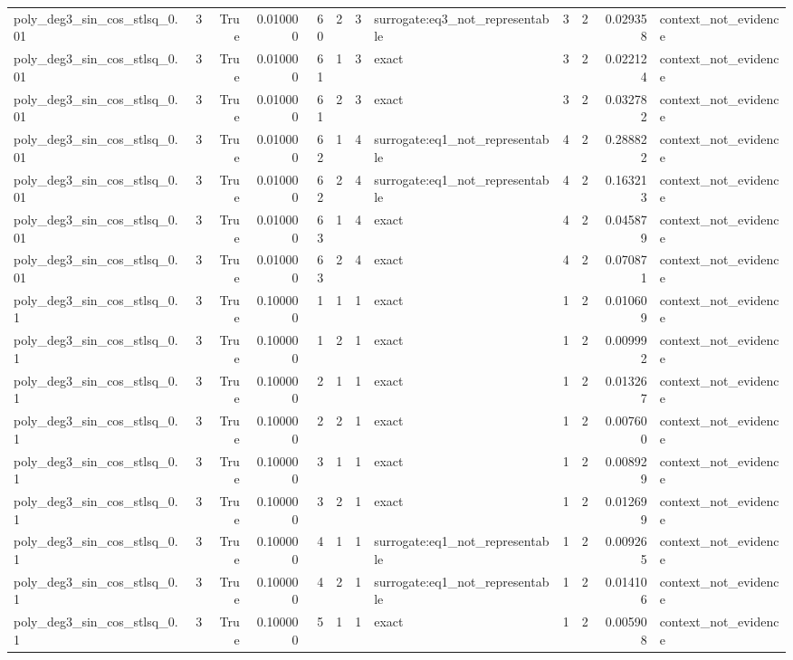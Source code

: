 \begin{tabular}{lrrrrrrlrrrl}
poly\_deg3\_sin\_cos\_stlsq\_0.01 & 3 & True & 0.010000 & 60 & 2 & 3 & surrogate:eq3\_not\_representable & 3 & 2 & 0.029358 & context\_not\_evidence \\
poly\_deg3\_sin\_cos\_stlsq\_0.01 & 3 & True & 0.010000 & 61 & 1 & 3 & exact & 3 & 2 & 0.022124 & context\_not\_evidence \\
poly\_deg3\_sin\_cos\_stlsq\_0.01 & 3 & True & 0.010000 & 61 & 2 & 3 & exact & 3 & 2 & 0.032782 & context\_not\_evidence \\
poly\_deg3\_sin\_cos\_stlsq\_0.01 & 3 & True & 0.010000 & 62 & 1 & 4 & surrogate:eq1\_not\_representable & 4 & 2 & 0.288822 & context\_not\_evidence \\
poly\_deg3\_sin\_cos\_stlsq\_0.01 & 3 & True & 0.010000 & 62 & 2 & 4 & surrogate:eq1\_not\_representable & 4 & 2 & 0.163213 & context\_not\_evidence \\
poly\_deg3\_sin\_cos\_stlsq\_0.01 & 3 & True & 0.010000 & 63 & 1 & 4 & exact & 4 & 2 & 0.045879 & context\_not\_evidence \\
poly\_deg3\_sin\_cos\_stlsq\_0.01 & 3 & True & 0.010000 & 63 & 2 & 4 & exact & 4 & 2 & 0.070871 & context\_not\_evidence \\
poly\_deg3\_sin\_cos\_stlsq\_0.1 & 3 & True & 0.100000 & 1 & 1 & 1 & exact & 1 & 2 & 0.010609 & context\_not\_evidence \\
poly\_deg3\_sin\_cos\_stlsq\_0.1 & 3 & True & 0.100000 & 1 & 2 & 1 & exact & 1 & 2 & 0.009992 & context\_not\_evidence \\
poly\_deg3\_sin\_cos\_stlsq\_0.1 & 3 & True & 0.100000 & 2 & 1 & 1 & exact & 1 & 2 & 0.013267 & context\_not\_evidence \\
poly\_deg3\_sin\_cos\_stlsq\_0.1 & 3 & True & 0.100000 & 2 & 2 & 1 & exact & 1 & 2 & 0.007600 & context\_not\_evidence \\
poly\_deg3\_sin\_cos\_stlsq\_0.1 & 3 & True & 0.100000 & 3 & 1 & 1 & exact & 1 & 2 & 0.008929 & context\_not\_evidence \\
poly\_deg3\_sin\_cos\_stlsq\_0.1 & 3 & True & 0.100000 & 3 & 2 & 1 & exact & 1 & 2 & 0.012699 & context\_not\_evidence \\
poly\_deg3\_sin\_cos\_stlsq\_0.1 & 3 & True & 0.100000 & 4 & 1 & 1 & surrogate:eq1\_not\_representable & 1 & 2 & 0.009265 & context\_not\_evidence \\
poly\_deg3\_sin\_cos\_stlsq\_0.1 & 3 & True & 0.100000 & 4 & 2 & 1 & surrogate:eq1\_not\_representable & 1 & 2 & 0.014106 & context\_not\_evidence \\
poly\_deg3\_sin\_cos\_stlsq\_0.1 & 3 & True & 0.100000 & 5 & 1 & 1 & exact & 1 & 2 & 0.005908 & context\_not\_evidence \\

\end{tabular}
